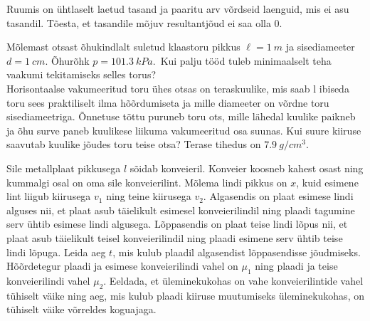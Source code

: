 \documentclass[10pt]{article}
\begin{document}
Ruumis on ühtlaselt laetud tasand ja paaritu arv võrdseid laenguid, mis ei asu tasandil. Tõesta, et tasandile mõjuv resultantjõud ei saa olla 0.
\probend
\bigskip

\setAuthor{}

Mõlemast otsast õhukindlalt suletud klaastoru pikkus $\ell=\SI{1}{m}$ ja sisediameeter $d=\SI{1}{cm}$. Õhurõhk $p=\SI{101.3}{kPa}$.\
\osa Kui palju tööd tuleb minimaalselt teha vaakumi tekitamiseks selles torus?\\
\osa Horisontaalse vakumeeritud toru ühes otsas on teraskuulike, mis saab l	ibiseda toru sees praktiliselt ilma hõõrdumiseta ja mille diameeter on võrdne toru sisediameetriga. Õnnetuse tõttu puruneb toru ots, mille lähedal kuulike paikneb  ja õhu surve paneb kuulikese liikuma vakumeeritud osa suunas. Kui suure kiiruse saavutab kuulike jõudes toru teise otsa? Terase tihedus on $\SI{7.9}{g/cm^3}$.
\probend
\bigskip

\setAuthor{}

Sile metallplaat pikkusega $l$ sõidab konveieril. Konveier koosneb kahest osast ning kummalgi osal on oma sile konveierilint. Mõlema lindi pikkus on $x$, kuid esimene lint liigub kiirusega $v_1$ ning teine kiirusega $v_2$. Algasendis on plaat esimese lindi alguses nii, et plaat asub täielikult esimesel konveierilindil ning plaadi tagumine serv ühtib esimese lindi algusega. Lõppasendis on plaat teise lindi lõpus nii, et plaat asub täielikult teisel konveierilindil ning plaadi esimene serv ühtib teise lindi lõpuga. Leida aeg $t$, mis kulub plaadil algasendist lõppasendisse jõudmiseks. Hõõrdetegur plaadi ja esimese konveierilindi vahel on $\mu_{1}$ ning plaadi ja teise konveierilindi vahel $\mu_{2}$. Eeldada, et üleminekukohas on vahe konveierilintide vahel tühiselt väike ning aeg, mis kulub plaadi kiiruse muutumiseks üleminekukohas, on tühiselt väike võrreldes koguajaga.
\probend
\bigskip

\end{document}
